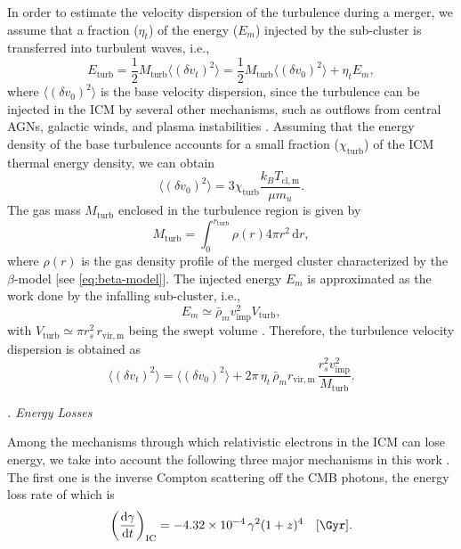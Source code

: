 \documentclass[twocolumn]{aastex62}
\newcommand{\R}[1]{\mathrm{#1}}
\newcommand{\D}[1]{\R{d} #1}
\newcommand{\diff}[2]{\frac{\D{#1}}{\D{#2}}}
\newcounter{sssseccount}
\newcommand{\sssseclabel}{\alph{sssseccount}}
\newcommand{\ssssec}[1]{%
  \vspace{1ex}%
  \stepcounter{sssseccount}%
  \noindent\emph{\sssseclabel. #1}%
}
\begin{document}
{In order to estimate the velocity dispersion of the turbulence during a
merger, we assume that a fraction ($\eta_t$) of the energy ($E_m$) injected
by the sub-cluster is transferred into turbulent waves, i.e.,
\begin{equation}
  \label{eq:energy-turb}
  E_{\R{turb}} =
    \frac{1}{2} M_{\R{turb}} \langle (\delta v_t)^2 \rangle =
    \frac{1}{2} M_{\R{turb}} \langle (\delta v_0)^2 \rangle + \eta_t E_m ,
\end{equation}
where
$\langle (\delta v_0)^2 \rangle$ is the base velocity dispersion, since
the turbulence can be injected in the ICM by several other mechanisms, such
as outflows from central AGNs, galactic winds, and plasma instabilities
\citep{iapichino2011,vazza2011}.
Assuming that the energy density of the base turbulence accounts for a
small fraction ($\chi_{\R{turb}}$) of the ICM thermal energy density, we
can obtain
\begin{equation}
  \label{eq:v-turb-init}
  \langle (\delta v_0)^2 \rangle
    = 3 \chi_{\R{turb}} \frac{k_B T_{\R{cl,m}}}{\mu m_u} .
\end{equation}
The gas mass $M_{\R{turb}}$ enclosed in the turbulence region is given by
\begin{equation}
  \label{eq:mass-turb}
  M_{\R{turb}} = \int_0^{r_{\R{turb}}} \! \rho(r) 4\pi r^2 \,\D{r},
\end{equation}
where $\rho(r)$ is the gas density profile of the merged cluster
characterized by the $\beta$-model [see \autoref{eq:beta-model}].
The injected energy $E_m$ is approximated as the work done by the infalling
sub-cluster, i.e.,
\begin{equation}
  \label{eq:energy-inj}
  E_m \simeq \bar{\rho}_m v_{\R{imp}}^2 V_{\R{turb}},
\end{equation}
with $V_{\R{turb}} \simeq \pi r_s^2 \,r_{\R{vir,m}}$ being the swept volume
\citep{fujita2003,cassano2005}.
Therefore, the turbulence velocity dispersion is obtained as
\begin{equation}
  \label{eq:v-turb}
  \langle (\delta v_t)^2 \rangle
    = \langle (\delta v_0)^2 \rangle
    + 2 \pi\,\eta_t\, \bar{\rho}_m r_{\R{vir,m}}
      \,\frac{r_s^2 v_{\R{imp}}^2}{M_{\R{turb}}} .
\end{equation}
} %

\ssssec{Energy Losses}

Among the mechanisms through which relativistic electrons
in the ICM can lose energy, we take into account the following three
major mechanisms in this work \citep{sarazin1999}.
The first one is the inverse Compton scattering off the CMB photons,
the energy loss rate of which is
\begin{equation}
  \label{eq:eloss-ic}
  \left( \diff{\gamma}{t} \right)_{\R{IC}} =
    \num{-4.32e-4} \,\gamma^2 (1+z)^4
    \quad [\si{\per\Gyr}].
\end{equation}
\end{document}
